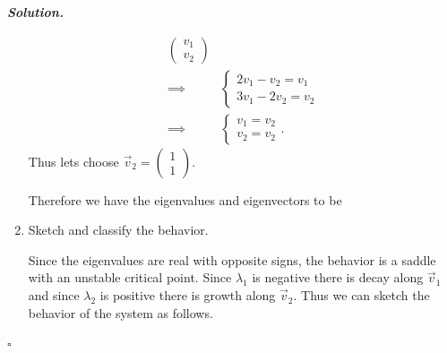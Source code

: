 \documentclass[12pt]{report}
\newenvironment{solution}[1][\it{Solution}]{\textbf{#1. } }{$\square$}
\newcommand*\widefbox[1]{\fbox{#1}}
\begin{document}
\begin{solution}
\begin{enumerate}
\begin{align*}
\begin{pmatrix}
                v_1\\
                v_2
            \end{pmatrix}\\
            \implies & \begin{cases}
                2v_1 - v_2 = v_1\\
                3v_1 - 2v_2 = v_2
            \end{cases}\\
            \implies &\begin{cases}
                v_1 = v_2\\
                v_2 = v_2
            \end{cases}.
        \end{align*}
        Thus lets choose $\vec{v}_2 = \begin{pmatrix}
            1\\
            1
        \end{pmatrix}$.
        
        Therefore we have the eigenvalues and eigenvectors to be
        
        
        
        \item [{\bf Part b:}] Sketch and classify the behavior.
        
        \noindent
        Since the eigenvalues are real with opposite signs, the behavior is a saddle with an unstable critical point. Since $\lambda_1$ is negative there is decay along $\vec{v}_1$ and since $\lambda_2$ is positive there is growth along $\vec{v}_2$. Thus we can sketch the behavior of the system as follows. 


\end{enumerate}
\end{solution}
\end{document}
